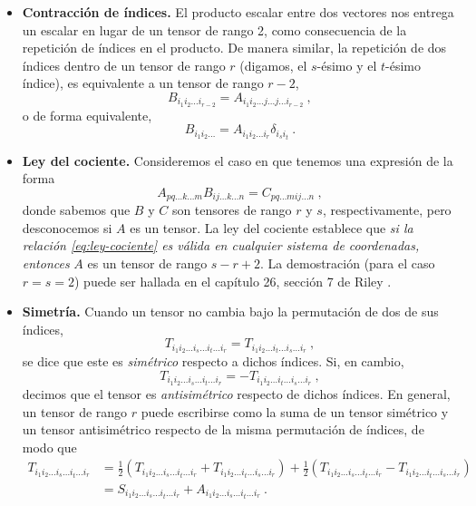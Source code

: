 \begin{itemize}
    \item \textbf{Contracción de índices.} El producto escalar entre dos vectores nos entrega un escalar en lugar de un tensor de rango 2, como consecuencia de la repetición de índices en el producto. De manera similar, la repetición de dos índices dentro de un tensor de rango $r$ (digamos, el $s$-ésimo y el $t$-ésimo índice), es equivalente a un tensor de rango $r-2$,
    \begin{equation}
        B_{i_1 i_2 \dots i_{r-2}} = A_{i_1 i_2 \dots j \dots j \dots i_{r-2}} \ ,
    \end{equation}
    o de forma equivalente,
    \begin{equation}
        B_{i_1 i_2 \dots} = A_{i_1 i_2 \dots i_r} \delta_{i_s i_t} \ .
    \end{equation}

    \item \textbf{Ley del cociente.} Consideremos el caso en que tenemos una expresión de la forma
    \begin{equation}\label{eq:ley-cociente}
        A_{pq \dots k \dots m} B_{ij \dots k \dots n} = C_{pq \dots m ij \dots n} \ ,
    \end{equation}
    donde sabemos que $B$ y $C$ son tensores de rango $r$ y $s$, respectivamente, pero desconocemos si $A$ es un tensor. La ley del cociente establece que \emph{si la relación \eqref{eq:ley-cociente} es válida en cualquier sistema de coordenadas, entonces} $A$ es un tensor de rango $s-r+2$. La demostración (para el caso $r=s=2$) puede ser hallada en el capítulo 26, sección 7 de Riley \cite{Riley}.
    
    \item \textbf{Simetría.} Cuando un tensor no cambia bajo la permutación de dos de sus índices, 
    \begin{equation}
        T_{i_1 i_2 \dots i_s \dots i_t \dots i_r} = T_{i_1 i_2 \dots i_t \dots i_s \dots i_r} \ , 
    \end{equation}
    se dice que este es \emph{simétrico} respecto a dichos índices. Si, en cambio,
    \begin{equation}
        T_{i_1 i_2 \dots i_s \dots i_t \dots i_r} = - T_{i_1 i_2 \dots i_t \dots i_s \dots i_r} \ ,
    \end{equation}
    decimos que el tensor es \emph{antisimétrico} respecto de dichos índices. En general, un tensor de rango $r$ puede escribirse como la suma de un tensor simétrico y un tensor antisimétrico respecto de la misma permutación de índices, de modo que
    \begin{align}
        T_{i_1 i_2 \dots i_s \dots i_t \dots i_r} & = \frac{1}{2} (T_{i_1 i_2 \dots i_s \dots i_t \dots i_r} + T_{i_1 i_2 \dots i_t \dots i_s \dots i_r}) + \frac{1}{2}(T_{i_1 i_2 \dots i_s \dots i_t \dots i_r} - T_{i_1 i_2 \dots i_t \dots i_s \dots i_r}) \\
        & = S_{i_1 i_2 \dots i_s \dots i_t \dots i_r} + A_{i_1 i_2 \dots i_s \dots i_t \dots i_r} \ .
    \end{align}


\end{itemize}
